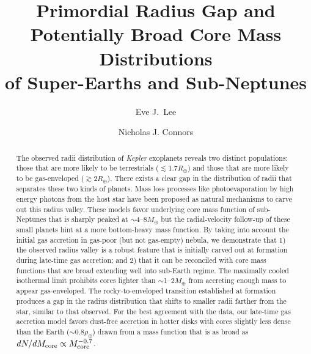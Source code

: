 \documentclass[twocolumn]{aastex63}
\begin{document}
\title{Primordial Radius Gap and Potentially Broad Core Mass Distributions\\ of Super-Earths and Sub-Neptunes}


\author[0000-0002-1228-9820]{Eve J.~Lee}

\author{Nicholas J. Connors}

\begin{abstract}

The observed radii distribution of {\it Kepler} exoplanets reveals two distinct populations: those that are more likely to be terrestrials ($\lesssim1.7R_\oplus$) and those that are more likely to be gas-enveloped ($\gtrsim2R_\oplus$). There exists a clear gap in the distribution of radii that separates these two kinds of planets. Mass loss processes like photoevaporation by high energy photons from the host star have been proposed as natural mechanisms to carve out this radius valley. These models favor underlying core mass function of sub-Neptunes that is sharply peaked at $\sim$4--8$M_\oplus$ but the radial-velocity follow-up of these small planets hint at a more bottom-heavy mass function. By taking into account the initial gas accretion in gas-poor (but not gas-empty) nebula, we demonstrate that 1) the observed radius valley is a robust feature that is initially carved out at formation during late-time gas accretion; and 2) that it can be reconciled with core mass functions that are broad extending well into sub-Earth regime. The maximally cooled isothermal limit prohibits cores lighter than $\sim$1--2$M_\oplus$ from accreting enough mass to appear gas-enveloped. The rocky-to-enveloped transition established at formation produces a gap in the radius distribution that shifts to smaller radii farther from the star, similar to that observed. For the best agreement with the data, our late-time gas accretion model
favors dust-free accretion in hotter disks with cores slightly less dense than the Earth ($\sim$0.8$\rho_\oplus$) drawn from a mass function that is as broad as $dN/dM_{\rm core} \propto M_{\rm core}^{-0.7}$.

\end{abstract}
\end{document}
